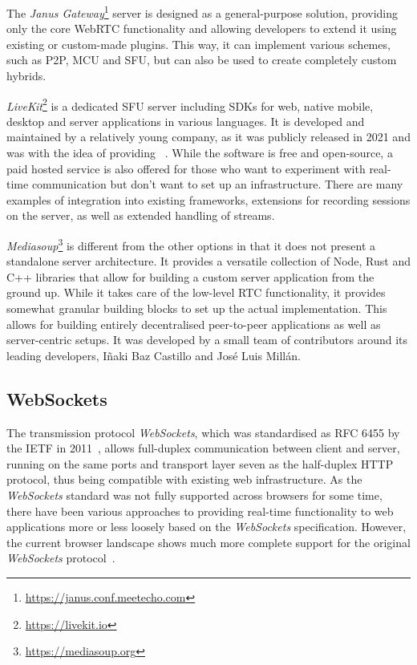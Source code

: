 

The \emph{Janus Gateway}\footnote{\url{https://janus.conf.meetecho.com}} server is designed as a general-purpose solution, providing only the core \ac{WebRTC} functionality and allowing developers to extend it using existing or custom-made plugins.
This way, it can implement various schemes, such as \ac{P2P}, \ac{MCU} and \ac{SFU}, but can also be used to create completely custom hybrids.

\emph{LiveKit}\footnote{\url{https://livekit.io}} is a dedicated \ac{SFU} server including \ac{SDK}s for web, native mobile, desktop and server applications in various languages.
It is developed and maintained by a relatively young company, as it was publicly released in 2021 and was  with the idea of providing ~\parencite{livekitAbout}.
While the software is free and open-source, a paid hosted service is also offered for those who want to experiment with real-time communication but don't want to set up an infrastructure.
There are many examples of integration into existing frameworks, extensions for recording sessions on the server, as well as extended handling of streams.

\emph{Mediasoup}\footnote{\url{https://mediasoup.org}} is different from the other options in that it does not present a standalone server architecture.
It provides a versatile collection of Node, Rust and C++ libraries that allow for building a custom server application from the ground up.
While it takes care of the low-level \ac{RTC} functionality, it provides somewhat granular building blocks to set up the actual implementation.
This allows for building entirely decentralised peer-to-peer applications as well as server-centric setups.
It was developed by a small team of contributors around its leading developers, Iñaki Baz Castillo and José Luis Millán.

\subsection{WebSockets}

The transmission protocol \emph{WebSockets}, which was standardised as \ac{RFC} 6455 by the \ac{IETF} in 2011~\parencite{webSocketsProtocolRfc}, allows full-duplex communication between client and server, running on the same ports and transport layer seven as the half-duplex \ac{HTTP} protocol, thus being compatible with existing web infrastructure.
As the \emph{WebSockets} standard was not fully supported across browsers for some time, there have been various approaches to providing real-time functionality to web applications more or less loosely based on the \emph{WebSockets} specification.
However, the current browser landscape shows much more complete support for the original \emph{WebSockets} protocol~\parencite{canIUseWebSockets}.

